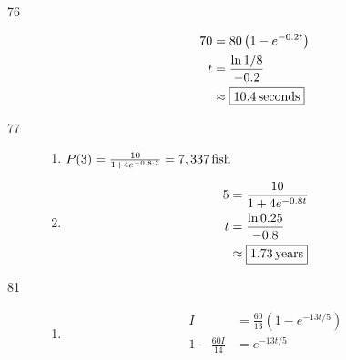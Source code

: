 \documentclass{exam}
\begin{document}
\begin{description}
      \item[76]
        \begin{align*}
          70          &= 80 \left( 1 - e^{-0.2t} \right) \\
          t           &= \frac{\ln 1/8}{-0.2} \\
                      &\approx \boxed{\unit[10.4]{seconds}} \\
        \end{align*}

      \item[77]
        \begin{enumerate}[a]
          \item $P(3) = \frac{10}{1 + 4e^{-0.8 \cdot 3}} = \unit[7,337]{fish}$

          \item 
            \begin{align*}
              5 &= \frac{10}{1 + 4e^{-0.8t}} \\
              t &= \frac{\ln 0.25}{-0.8} \\
                &\approx \boxed{\unit[1.73]{years}} \\
            \end{align*}
        \end{enumerate}

      \item[81]
        \begin{enumerate}[a]
          \item 
            \begin{align*}
              I &= \frac{60}{13}\left( 1 - e^{-13t/5} \right) \\
              1 - \frac{60 I}{14} &= e^{-13t/5} \\
            \end{align*}

        \end{enumerate}

    \end{description}
\end{document}
